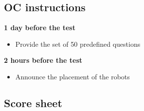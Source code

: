 \subsection{OC instructions}

\textbf{1 day before the test}
\begin{itemize}
\item Provide the set of 50 predefined questions
\end{itemize}
\textbf{2 hours before the test}
\begin{itemize}
\item Announce the placement of the robots
\end{itemize}

\subsection{Score sheet}


